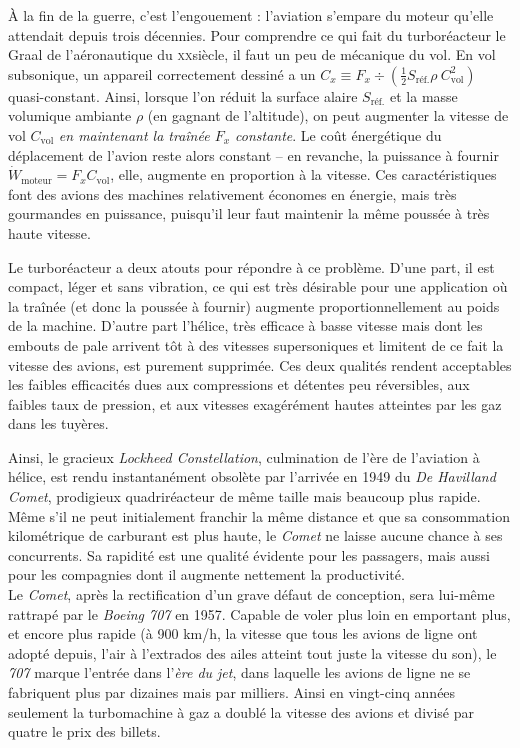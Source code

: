À la fin de la guerre, c’est l’engouement : l’aviation s’empare du moteur qu’elle attendait depuis trois décennies. Pour comprendre ce qui fait du turboréacteur le Graal de l’aéronautique du \textsc{xx}\ieme siècle, il faut un peu de mécanique du vol. En vol subsonique, un appareil correctement dessiné a un  $C_x \equiv F_x \div \left(\frac{1}{2} S_\text{réf.} \rho \ C_\text{vol}^2\right)$ quasi-constant. Ainsi, lorsque l’on réduit la surface alaire $S_\text{réf.}$ et la masse volumique ambiante $\rho$ (en gagnant de l’altitude), on peut augmenter la vitesse de vol $C_\text{vol}$ \emph{en maintenant la traînée $F_x$ constante}. Le coût énergétique du déplacement de l’avion reste alors constant -- en revanche, la puissance à fournir $\dot W_\text{moteur} = F_x C_\text{vol}$, elle, augmente en proportion à la vitesse. Ces caractéristiques font des avions des machines relativement économes en énergie, mais très gourmandes en puissance, puisqu’il leur faut maintenir la même poussée à très haute vitesse.

Le turboréacteur a deux atouts pour répondre à ce problème. D’une part, il est compact, léger et sans vibration, ce qui est très désirable pour une application où la traînée (et donc la poussée à fournir) augmente proportionnellement au poids de la machine. D’autre part l’hélice, très efficace à basse vitesse mais dont les embouts de pale arrivent tôt à des vitesses supersoniques et limitent de ce fait la vitesse des avions, est purement supprimée. Ces deux qualités rendent acceptables les faibles efficacités dues aux compressions et détentes peu réversibles, aux faibles taux de pression, et aux vitesses exagérément hautes atteintes par les gaz dans les tuyères.

Ainsi, le gracieux \textit{Lockheed Constellation}, culmination de l’ère de l’aviation à hélice, est rendu instantanément obsolète par l’arrivée en 1949 du \textit{De Havilland Comet}, prodigieux quadriréacteur de même taille mais beaucoup plus rapide. Même s’il ne peut initialement franchir la même distance et que sa consommation kilométrique de carburant est plus haute, le \textit{Comet} ne laisse aucune chance à ses concurrents. Sa rapidité est une qualité évidente pour les passagers, mais aussi pour les compagnies dont il augmente nettement la productivité.\\
Le \textit{Comet}, après la rectification d’un grave défaut de conception, sera lui-même rattrapé par le \textit{Boeing 707} en 1957. Capable de voler plus loin en emportant plus, et encore plus rapide (à 900 km/h, la vitesse que tous les avions de ligne ont adopté depuis, l’air à l’extrados des ailes atteint tout juste la vitesse du son), le \textit{707} marque l’entrée dans l’\textit{ère du jet}, dans laquelle les avions de ligne ne se fabriquent plus par dizaines mais par milliers. Ainsi en vingt-cinq années seulement la turbomachine à gaz a doublé la vitesse des avions et divisé par quatre le prix des billets.

